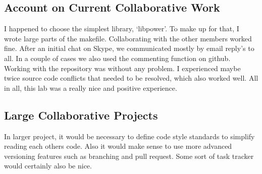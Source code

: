 \documentclass[a4paper,11pt,twoside]{article}
\begin{document}
\subsection{Account on Current Collaborative Work}
I happened to choose the simplest library, `libpower'. To make up for that, I wrote large parts of the makefile. Collaborating with the other members worked fine. After an initial chat on Skype, we communicated mostly by email reply's to all. In a couple of cases we also used the commenting function on github. Working with the repository was without any problem. I experienced maybe twice source code conflicts that needed to be resolved, which also worked well. All in all, this lab was a really nice and positive experience.

\subsection{Large Collaborative Projects}
In larger project, it would be necessary to define code style standards to simplify reading each others code. Also it would make sense to use more advanced versioning features such as branching and pull request. Some sort of task tracker would certainly also be nice.

%
\end{document}

